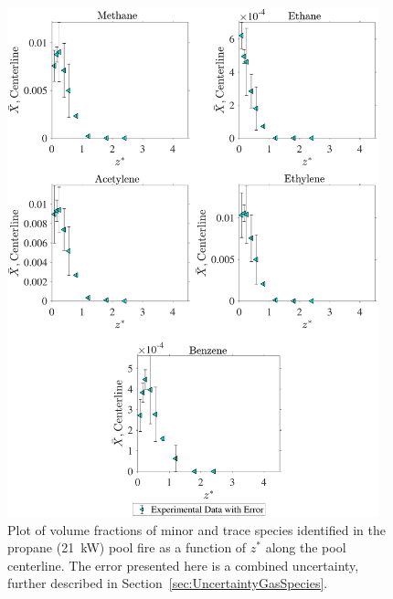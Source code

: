 \documentclass[12pt]{article}
\begin{document}
\begin{figure}[!h]
	\centering
\includegraphics[width=10.75cm,keepaspectratio]{Propane 21KW_Inter_MOL_FRAC_Plot.pdf}
	\caption[Volume fractions of minor and trace species in the propane (21~kW) plume]{Plot of volume fractions of minor and trace species identified in the propane (21~kW) pool fire as a function of $z^{*}$ along the pool centerline. The error presented here is a combined uncertainty, further described in Section~\ref{sec:UncertaintyGasSpecies}.}
	\label{fig:Propane20kW_VOL_Frac_Inter}
\end{figure}
\clearpage

\pagebreak
\end{document}
